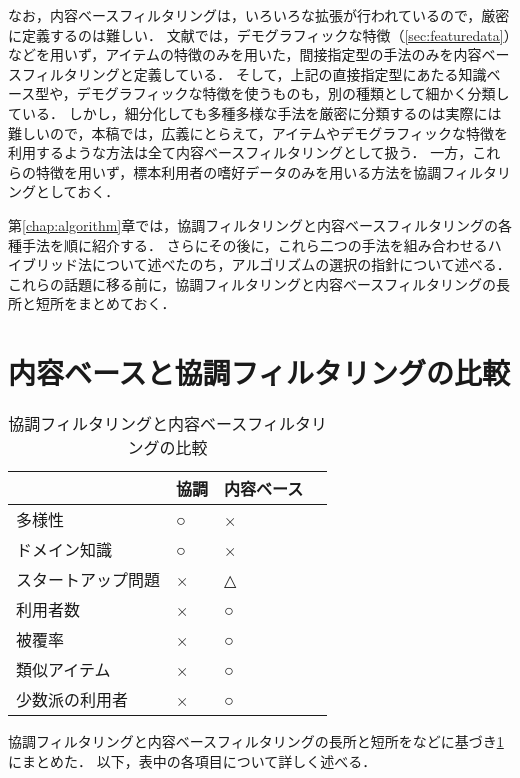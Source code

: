 なお，内容ベースフィルタリングは，いろいろな拡張が行われているので，厳密に定義するのは難しい．
文献\cite{ej:048}では，デモグラフィックな特徴（\ref{sec:featuredata}）などを用いず，アイテムの特徴のみを用いた，間接指定型の手法のみを内容ベースフィルタリングと定義している．
そして，上記の直接指定型にあたる知識ベース型や，デモグラフィックな特徴を使うものも，別の種類として細かく分類している．
しかし，細分化しても多種多様な手法を厳密に分類するのは実際には難しいので，本稿では，広義にとらえて，アイテムやデモグラフィックな特徴を利用するような方法は全て内容ベースフィルタリングとして扱う．
一方，これらの特徴を用いず，標本利用者の嗜好データのみを用いる方法を協調フィルタリングとしておく．

第\ref{chap:algorithm}章では，協調フィルタリングと内容ベースフィルタリングの各種手法を順に紹介する．
さらにその後に，これら二つの手法を組み合わせるハイブリッド法について述べたのち，アルゴリズムの選択の指針について述べる．
これらの話題に移る前に，協調フィルタリングと内容ベースフィルタリングの長所と短所をまとめておく．

\section{内容ベースと協調フィルタリングの比較}
\label{sec:cfcbfcomp}

\begin{table}
\centering
\caption{協調フィルタリングと内容ベースフィルタリングの比較}
\label{tab:cfcbfcomp}
\begin{tabular}{l@{\qquad}>{\centering}p{}>{\centering}p{}p{0pt}}\toprule
 & 協調 & 内容ベース & \\\midrule
多様性 & ○ & × & \\
ドメイン知識 & ○ & × & \\
スタートアップ問題 & × & △ & \\
利用者数 & × & ○ & \\
被覆率 & × & ○ & \\
類似アイテム & × & ○ & \\
少数派の利用者 & × & ○ & \\
\bottomrule
\end{tabular}
\end{table}

協調フィルタリングと内容ベースフィルタリングの長所と短所を\cite{macm:97:02,ej:048}などに基づき\ref{tab:cfcbfcomp}にまとめた．
以下，表中の各項目について詳しく述べる．

